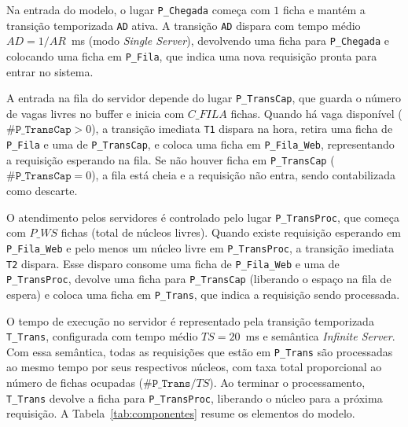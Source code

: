 \documentclass[conference,10pt]{IEEEtran}
\begin{document}
Na entrada do modelo, o lugar \texttt{P\_Chegada} começa com $1$ ficha e mantém a transição temporizada \texttt{AD} ativa. A transição \texttt{AD} dispara com tempo médio $AD = 1/AR$~ms (modo \textit{Single Server}), devolvendo uma ficha para \texttt{P\_Chegada} e colocando uma ficha em \texttt{P\_Fila}, que indica uma nova requisição pronta para entrar no sistema.

A entrada na fila do servidor depende do lugar \texttt{P\_TransCap}, que guarda o número de vagas livres no buffer e inicia com $C\_FILA$ fichas. Quando há vaga disponível ($\#\texttt{P\_TransCap} > 0$), a transição imediata \texttt{T1} dispara na hora, retira uma ficha de \texttt{P\_Fila} e uma de \texttt{P\_TransCap}, e coloca uma ficha em \texttt{P\_Fila\_Web}, representando a requisição esperando na fila. Se não houver ficha em \texttt{P\_TransCap} ($\#\texttt{P\_TransCap} = 0$), a fila está cheia e a requisição não entra, sendo contabilizada como descarte.

O atendimento pelos servidores é controlado pelo lugar \texttt{P\_TransProc}, que começa com $P\_WS$ fichas (total de núcleos livres). Quando existe requisição esperando em \texttt{P\_Fila\_Web} e pelo menos um núcleo livre em \texttt{P\_TransProc}, a transição imediata \texttt{T2} dispara. Esse disparo consome uma ficha de \texttt{P\_Fila\_Web} e uma de \texttt{P\_TransProc}, devolve uma ficha para \texttt{P\_TransCap} (liberando o espaço na fila de espera) e coloca uma ficha em \texttt{P\_Trans}, que indica a requisição sendo processada.

O tempo de execução no servidor é representado pela transição temporizada \texttt{T\_Trans}, configurada com tempo médio $TS = 20$~ms e semântica \textit{Infinite Server}. Com essa semântica, todas as requisições que estão em \texttt{P\_Trans} são processadas ao mesmo tempo por seus respectivos núcleos, com taxa total proporcional ao número de fichas ocupadas ($\#\texttt{P\_Trans} / TS$). Ao terminar o processamento, \texttt{T\_Trans} devolve a ficha para \texttt{P\_TransProc}, liberando o núcleo para a próxima requisição. A Tabela~\ref{tab:componentes} resume os elementos do modelo.
\end{document}
